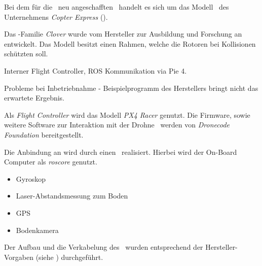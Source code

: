 
Bei dem für die \DHBW\ neu angeschafften \Quad\ handelt es sich um das Modell \Clover\ des Unternehmens \textit{Copter Express} (\COEX).

Das \Quad-Familie \textit{Clover} wurde vom Hersteller zur Ausbildung und Forschung an \Quad[n] entwickelt. Das Modell besitzt einen Rahmen, welche die Rotoren bei Kollisionen schützten soll.




Interner Flight Controller, ROS Kommunikation via Pie 4.




Probleme bei Inbetriebnahme - Beispielprogramm des Herstellers bringt nicht das erwartete Ergebnis.




Als \textit{Flight Controller} wird das Modell \textit{PX4 Racer} genutzt. Die Firmware, sowie weitere Software zur Interaktion mit der Drohne \Clover\ werden von \textit{Dronecode Foundation} bereitgestellt.

Die Anbindung an \ROS wird durch einen \Pie\ realisiert. Hierbei wird der On-Board Computer als \textit{roscore} genutzt.


\begin{itemize}
\item Gyroskop
\item Laser-Abstandsmessung zum Boden
\item GPS
\item Bodenkamera
\end{itemize}


Der Aufbau und die Verkabelung des \Quad[s] \Clover\ wurden entsprechend der Hersteller-Vorgaben (siehe \cite{coexAssembly}) durchgeführt.

